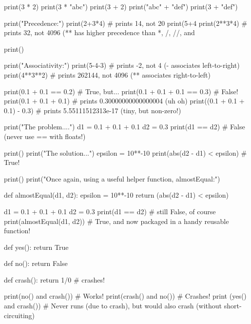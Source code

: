 \begin{runpython}
print(3 * 2)
print(3 * "abc")
print(3 + 2)
print("abc" + "def")
print(3 + "def")
\end{runpython}

\begin{runpython}
print("Precedence:")
print(2+3*4)  # prints 14, not 20
print(5+4%
print(2**3*4) # prints 32, not 4096 (** has higher precedence than *, /, //, and %

print()

print("Associativity:")
print(5-4-3)   # prints -2, not 4 (- associates left-to-right)
print(4**3**2) # prints 262144, not 4096 (** associates right-to-left)
\end{runpython}

\begin{runpython}
print(0.1 + 0.1 == 0.2)        # True, but...
print(0.1 + 0.1 + 0.1 == 0.3)  # False!
print(0.1 + 0.1 + 0.1)         # prints 0.30000000000000004 (uh oh)
print((0.1 + 0.1 + 0.1) - 0.3) # prints 5.55111512313e-17 (tiny, but non-zero!)
\end{runpython}

\begin{runpython}
print("The problem....")
d1 = 0.1 + 0.1 + 0.1
d2 = 0.3
print(d1 == d2)                # False (never use == with floats!)

print()
print("The solution...")
epsilon = 10**-10
print(abs(d2 - d1) < epsilon)  # True!

print()
print("Once again, using a useful helper function, almostEqual:")

def almostEqual(d1, d2):
    epsilon = 10**-10
    return (abs(d2 - d1) < epsilon)

d1 = 0.1 + 0.1 + 0.1
d2 = 0.3
print(d1 == d2)            # still False, of course
print(almostEqual(d1, d2)) # True, and now packaged in a handy reusable function!
\end{runpython}

\begin{runpython}
def yes():
    return True

def no():
    return False

def crash():
    return 1/0 # crashes!

print(no() and crash()) # Works!
print(crash() and no()) # Crashes!
print (yes() and crash()) # Never runs (due to crash), but would also crash (without short-circuiting)
\end{runpython}

